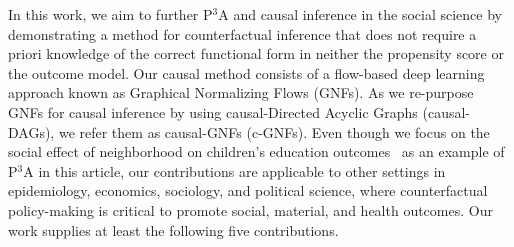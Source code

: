 \documentclass[letterpaper]{article} %
\begin{document}
In this work, we aim to further P$^3$A and causal inference in the social science by demonstrating a method for counterfactual inference that does not require a priori knowledge of the correct functional form in neither the propensity score or the outcome model. Our causal method consists of a flow-based deep learning approach known as Graphical Normalizing Flows (GNFs). As we re-purpose GNFs for causal inference by using causal-Directed Acyclic Graphs (causal-DAGs), we refer them as causal-GNFs (c-GNFs). Even though we focus on the social effect of neighborhood on children's education outcomes~\cite{wodtke2020rwr} as an example of P$^3$A in this article, our contributions are applicable to other settings in epidemiology, economics, sociology, and political science, where counterfactual policy-making is critical to promote social, material, and health outcomes. 
Our work supplies at least the following five contributions.
\end{document}
